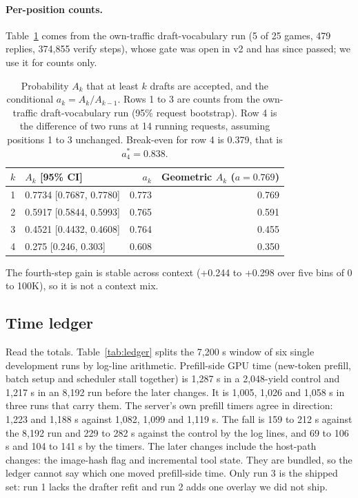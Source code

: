\paragraph{Per-position counts.}
Table~\ref{tab:perpos} comes from the own-traffic draft-vocabulary run (5 of 25 games, 479 replies, 374,855 verify steps), whose gate was open in v2 and has since passed; we use it for counts only. %

\begin{table}[!htb]
\caption{Probability $A_k$ that at least $k$ drafts are accepted, and the conditional $a_k=A_k/A_{k-1}$. Rows 1 to 3 are counts from the own-traffic draft-vocabulary run (95\% request bootstrap). Row 4 is the difference of two runs at 14 running requests, assuming positions 1 to 3 unchanged. Break-even for row 4 is 0.379, that is $a_4^{*}=0.838$.}\label{tab:perpos}
\centering\footnotesize
\begin{tabular}{@{}rlrr@{}}
\toprule
$k$ & $A_k$ [95\% CI] & $a_k$ & Geometric $A_k$ ($a=0.769$) \\
\midrule
1 & 0.7734 [0.7687, 0.7780] & 0.773 & 0.769 \\ %
2 & 0.5917 [0.5844, 0.5993] & 0.765 & 0.591 \\ %
3 & 0.4521 [0.4432, 0.4608] & 0.764 & 0.455 \\ %
4 & 0.275 [0.246, 0.303] & 0.608 & 0.350 \\ %
\bottomrule
\end{tabular}
\end{table}

The fourth-step gain is stable across context (+0.244 to +0.298 over five bins of 0 to 100K), so it is not a context mix. %



\subsection{Time ledger}\label{app:time}

Read the totals. Table~\ref{tab:ledger} splits the 7,200 s window of six single development runs by log-line arithmetic. %
Prefill-side GPU time (new-token prefill, batch setup and scheduler stall together) is 1,287 s in a 2,048-yield control and 1,217 s in an 8,192 run before the later changes. It is 1,005, 1,026 and 1,058 s in three runs that carry them. %
The server's own prefill timers agree in direction: 1,223 and 1,188 s against 1,082, 1,099 and 1,119 s. The fall is 159 to 212 s against the 8,192 run and 229 to 282 s against the control by the log lines, and 69 to 106 s and 104 to 141 s by the timers. %
The later changes include the host-path changes: the image-hash flag and incremental tool state. They are bundled, so the ledger cannot say which one moved prefill-side time. Only run 3 is the shipped set: run 1 lacks the drafter refit and run 2 adds one overlay we did not ship. %



